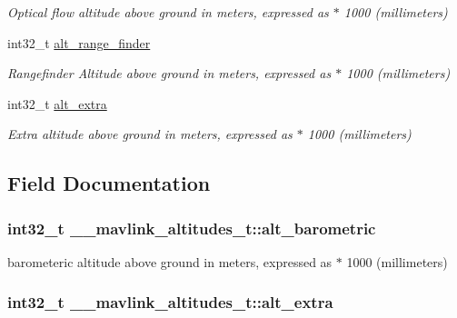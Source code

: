\begin{DoxyCompactItemize}
\begin{DoxyCompactList}\small\item\em Optical flow altitude above ground in meters, expressed as $\ast$ 1000 (millimeters) \end{DoxyCompactList}\item 
int32\+\_\+t \hyperlink{struct____mavlink__altitudes__t_a157ed8703ee42ca4b2a02149bceae40b}{alt\+\_\+range\+\_\+finder}
\begin{DoxyCompactList}\small\item\em Rangefinder Altitude above ground in meters, expressed as $\ast$ 1000 (millimeters) \end{DoxyCompactList}\item 
int32\+\_\+t \hyperlink{struct____mavlink__altitudes__t_af23e703fbf9b614c276619c0d983dea6}{alt\+\_\+extra}
\begin{DoxyCompactList}\small\item\em Extra altitude above ground in meters, expressed as $\ast$ 1000 (millimeters) \end{DoxyCompactList}\end{DoxyCompactItemize}


\subsection{Field Documentation}
\hypertarget{struct____mavlink__altitudes__t_a6144fda62af98aa055b2e93031bb434b}{
\subsubsection[{alt\+\_\+barometric}]{\setlength{\rightskip}{0pt plus 5cm}int32\+\_\+t \+\_\+\+\_\+mavlink\+\_\+altitudes\+\_\+t\+::alt\+\_\+barometric}}\label{struct____mavlink__altitudes__t_a6144fda62af98aa055b2e93031bb434b}


barometeric altitude above ground in meters, expressed as $\ast$ 1000 (millimeters) 

\hypertarget{struct____mavlink__altitudes__t_af23e703fbf9b614c276619c0d983dea6}{
\subsubsection[{alt\+\_\+extra}]{\setlength{\rightskip}{0pt plus 5cm}int32\+\_\+t \+\_\+\+\_\+mavlink\+\_\+altitudes\+\_\+t\+::alt\+\_\+extra}}\label{struct____mavlink__altitudes__t_af23e703fbf9b614c276619c0d983dea6}


